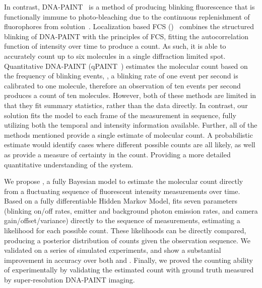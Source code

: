 %
In contrast, DNA-PAINT~\citep{schnitzbauer_2017} is a method of producing
blinking fluorescence that is functionally immune to photo-bleaching due to the
continuous replenishment of fluorophores from solution~\citep{stehr_2021}.
  Localization based FCS (\lbfcs)~\citep{stein_2019,stein_2021} combines the
  structured blinking of DNA-PAINT with the principles of FCS, fitting the
  autocorrelation function of intensity over time to produce a count. As such,
  it is able to accurately count up to six molecules in a single diffraction
  limited spot.
  Quantitative DNA-PAINT (qPAINT~\citep{jungmann_2016}) estimates the molecular
  count based on the frequency of blinking events, \ie, a blinking rate of one
  event per second is calibrated to one molecule, therefore an observation of
  ten events per second produces a count of ten molecules.
  However, both of these methods are limited in that they fit summary
  statistics, rather than the data directly.
  In contrast, our solution fits the model to each frame of the measurement 
  in sequence, fully utilizing both the temporal and intensity information available.
  Further, all of the methods mentioned provide a single estimate of molecular count. 
  A probabilistic estimate would identify cases where different possible counts are all likely,
  as well as provide a measure of certainty in the count. Providing a more detailed quantitative 
  understanding of the system. 

We propose \ours, a fully Bayesian model to estimate the molecular count
directly from a fluctuating sequence of fluorescent intensity measurements over
time.
  Based on a fully differentiable Hidden Markov Model, \ours fits
  seven parameters (blinking on/off rates, emitter and background photon emission rates, 
  and camera gain/offset/variance) directly to the sequence of measurements, 
  estimating a likelihood for each possible count.
  These likelihoods can be directly compared, producing a posterior
  distribution of counts given the observation sequence.
  We validated \ours on a series of simulated experiments, and show a
  substantial improvement in accuracy over both \lbfcs and \qpaint.
  Finally, we proved the counting ability of \ours experimentally by validating 
  the estimated count with ground truth measured by super-resolution DNA-PAINT imaging.

